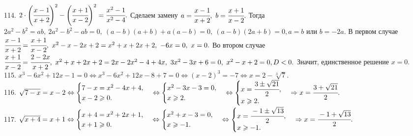 114. $2\cdot\left(\cfrac{x-1}{x+2}\right)^2-\left(\cfrac{x+1}{x-2}\right)^2=\cfrac{x^2-1}{x^2-4}.$ Сделаем замену $a=\cfrac{x-1}{x+2},\ b=\cfrac{x+1}{x-2}.$ Тогда $2a^2-b^2=ab,\ 2a^2-b^2-ab=0,\ (a-b)(a+b)+a(a-b)=0,\ (a-b)(2a+b)=0, a=b$ или $b=-2a.$ В первом случае $\cfrac{x-1}{x+2}=\cfrac{x+1}{x-2},\ x^2-x-2x+2=x^2+x+2x+2,\ -6x=0,\ x=0.$ Во втором случае $\cfrac{x+1}{x-2}=\cfrac{2-2x}{x+2},\ x^2+x+2x+2=2x-2x^2-4+4x,\ 3x^2-3x+6=0,\ x^2-x+2=0, D<0.$ Значит, единственное решение $x=0.$\\
115. $x^3-6x^2+12x-1=0\Leftrightarrow x^3-6x^2+12x-8+7=0 \Leftrightarrow (x-2)^3=-7 \Leftrightarrow x=2-\sqrt[3]{7}.$\\
116. $\sqrt{7-x}=x-2\Leftrightarrow\begin{cases} 7-x=x^2-4x+4,\\ x-2\geqslant0.\end{cases}\Leftrightarrow\begin{cases} x^2-3x-3=0,\\ x\geqslant2.\end{cases}\Leftrightarrow\begin{cases} x=\cfrac{3\pm\sqrt{21}}{2},\\ x\geqslant2.\end{cases}\Rightarrow x=\cfrac{3+\sqrt{21}}{2}.$\\
117. $\sqrt{x+4}=x+1\Leftrightarrow\begin{cases} x+4=x^2+2x+1,\\ x+1\geqslant0.\end{cases}\Leftrightarrow\begin{cases} x^2+x-3=0,\\ x\geqslant-1.\end{cases}\Leftrightarrow\begin{cases} x=\cfrac{-1\pm\sqrt{13}}{2},\\ x\geqslant-1.\end{cases}\Rightarrow x=\cfrac{-1+\sqrt{13}}{2}.$\\
